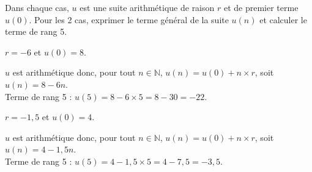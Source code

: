 \documentclass[11pt,a4paper]{article}  %
\begin{document}
Dans chaque cas, $u$ est une suite arithmétique de raison $r$ et de premier terme $u(0)$. Pour les 2 cas, exprimer le terme général de la suite $u(n)$ et calculer le terme de rang 5.
\begin{enumMet}
	\item $r=-6$ et $u(0)=8$.
	\par
	\begin{corrBox}
		$u$ est arithmétique donc, pour tout $n\in\mathbb{N}$, $u(n)=u(0)+n\times r$, soit $u(n)=8-6n$.\\
		Terme de rang 5 : $u(5)=8-6\times 5=8-30=-22$.
	\end{corrBox}

	\item {} $r=-1,5$ et $u(0)=4$.
	\par
	\begin{corrBox}
		$u$ est arithmétique donc, pour tout $n\in\mathbb{N}$, $u(n)=u(0)+n\times r$, soit $u(n)=4-1,5n$.\\
		Terme de rang 5 : $u(5)=4-1,5\times 5=4-7,5=-3,5$.
	\end{corrBox}
\end{enumMet}
\end{document}
